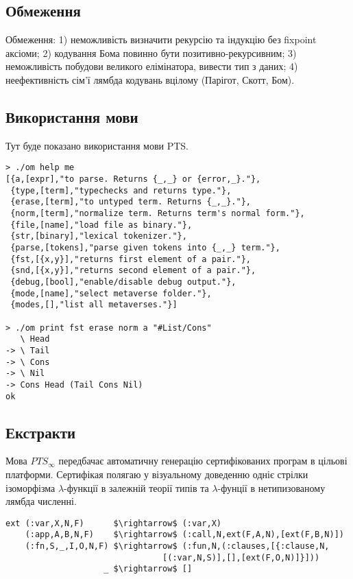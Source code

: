 \subsection*{Обмеження}
Обмеження:
1) неможливість визначити рекурсію та індукцію без fixpoint аксіоми;
2) кодування Бома повинно бути позитивно-рекурсивним;
3) неможливість побудови великого елімінатора, вивести тип з даних;
4) неефективність сім'ї лямбда кодувань вцілому (Парігот, Скотт, Бом).

\newpage
\subsection{Використання мови}
Тут буде показано використання мови PTS.

\begin{lstlisting}
> ./om help me
[{a,[expr],"to parse. Returns {_,_} or {error,_}."},
 {type,[term],"typechecks and returns type."},
 {erase,[term],"to untyped term. Returns {_,_}."},
 {norm,[term],"normalize term. Returns term's normal form."},
 {file,[name],"load file as binary."},
 {str,[binary],"lexical tokenizer."},
 {parse,[tokens],"parse given tokens into {_,_} term."},
 {fst,[{x,y}],"returns first element of a pair."},
 {snd,[{x,y}],"returns second element of a pair."},
 {debug,[bool],"enable/disable debug output."},
 {mode,[name],"select metaverse folder."},
 {modes,[],"list all metaverses."}]

> ./om print fst erase norm a "#List/Cons"
   \ Head
-> \ Tail
-> \ Cons
-> \ Nil
-> Cons Head (Tail Cons Nil)
ok
\end{lstlisting}


\subsection*{Екстракти}
Мова $PTS_\infty$ передбачає автоматичну генерацію сертифікованих програм в цільові платформи.
Сертифікая полягаю у візуальному доведенню одніє стрілки ізоморфізма
$\lambda$-функції в залежній теорії типів та $\lambda$-фунції в нетипизованому лямбда численні.

\begin{lstlisting}[mathescape=true]
ext (:var,X,N,F)      $\rightarrow$ (:var,X)
    (:app,A,B,N,F)    $\rightarrow$ (:call,N,ext(F,A,N),[ext(F,B,N)])
    (:fn,S,_,I,O,N,F) $\rightarrow$ (:fun,N,(:clauses,[{:clause,N,
                                [(:var,N,S)],[],[ext(F,O,N)]}]))
                    _ $\rightarrow$ []
\end{lstlisting}

